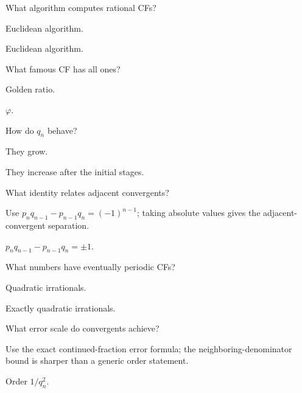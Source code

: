 \begin{exercise}\label{exr:ii25-03}
What algorithm computes rational CFs?
\end{exercise}
\begin{hint}
Euclidean algorithm.
\end{hint}
\begin{solution}
Euclidean algorithm.
\end{solution}

\begin{exercise}\label{exr:ii25-04}
What famous CF has all ones?
\end{exercise}
\begin{hint}
Golden ratio.
\end{hint}
\begin{solution}
$\varphi$.
\end{solution}

\begin{exercise}\label{exr:ii25-05}
How do $q_n$ behave?
\end{exercise}
\begin{hint}
They grow.
\end{hint}
\begin{solution}
They increase after the initial stages.
\end{solution}

\begin{exercise}\label{exr:ii25-06}
What identity relates adjacent convergents?
\end{exercise}
\begin{hint}
Use \(p_nq_{n-1}-p_{n-1}q_n=(-1)^{n-1}\); taking absolute values gives the adjacent-convergent separation.
\end{hint}
\begin{solution}
$p_nq_{n-1}-p_{n-1}q_n=\pm1$.
\end{solution}

\begin{exercise}\label{exr:ii25-07}
What numbers have eventually periodic CFs?
\end{exercise}
\begin{hint}
Quadratic irrationals.
\end{hint}
\begin{solution}
Exactly quadratic irrationals.
\end{solution}

\begin{exercise}\label{exr:ii25-08}
What error scale do convergents achieve?
\end{exercise}
\begin{hint}
Use the exact continued-fraction error formula; the neighboring-denominator bound is sharper than a generic order statement.
\end{hint}
\begin{solution}
Order $1/q_n^2$.
\end{solution}


